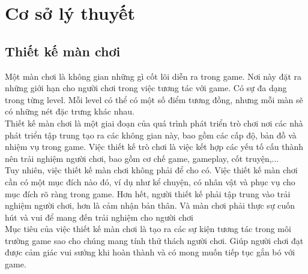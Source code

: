 \section{Cơ sở lý thuyết}
\subsection{Thiết kế màn chơi}
\hspace*{0.5cm} Một màn chơi là không gian những gì cốt lõi diễn ra trong game. Nơi này đặt ra những giới hạn cho người chơi trong việc tương tác với game. Có sự đa dạng trong từng level. Mỗi level có thể có một số điểm tương đồng, nhưng mỗi màn sẽ có những nét đặc trưng khác nhau.\\
\hspace*{0.5cm} Thiết kế màn chơi là một giai đoạn của quá trình phát triển trò chơi nơi các nhà phát triển tập trung tạo ra các không gian này, bao gồm các cấp độ, bản đồ và nhiệm vụ trong game. Việc thiết kế trò chơi là việc kết hợp các yếu tố cấu thành nên trải nghiệm người chơi, bao gồm cơ chế game, gameplay, cốt truyện,...\\
\hspace*{0.5cm} Tuy nhiên, việc thiết kế màn chơi không phải để cho có. Việc thiết kế màn chơi cần có một mục đích nào đó, ví dụ như kể chuyện, có nhân vật và phục vụ cho mục đích rõ ràng trong game. Hơn hết, người thiết kế phải tập trung vào trải nghiệm người chơi, hơn là cảm nhận bản thân. Và màn chơi phải thực sự cuốn hút và vui để mang đến trải nghiệm cho người chơi\\
\hspace*{0.5cm} Mục tiêu của việc thiết kế màn chơi là tạo ra các sự kiện tương tác trong môi trường game sao cho chúng mang tính thử thách người chơi. Giúp người chơi đạt được cảm giác vui sướng khi hoàn thành và có mong muốn tiếp tục gắn bó với game.\\
